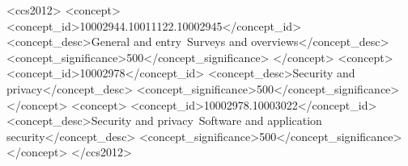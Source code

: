 
\begin{CCSXML}
    <ccs2012>
    <concept>
        <concept_id>10002944.10011122.10002945</concept_id>
        <concept_desc>General and entry~Surveys and overviews</concept_desc>
        <concept_significance>500</concept_significance>
    </concept>
    <concept>
        <concept_id>10002978</concept_id>
        <concept_desc>Security and privacy</concept_desc>
        <concept_significance>500</concept_significance>
    </concept>
    <concept>
        <concept_id>10002978.10003022</concept_id>
        <concept_desc>Security and privacy~Software and application security</concept_desc>
        <concept_significance>500</concept_significance>
    </concept>
    </ccs2012>
\end{CCSXML}


